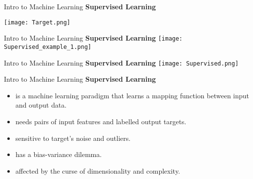 \documentclass{beamer}
\begin{document}
\begin{frame}[fragile]{Intro to Machine Learning}
    \textbf{Supervised Learning}
    \begin{center}
        \texttt{[image: Target.png]}
    \end{center}
\end{frame}
\begin{frame}[fragile]{Intro to Machine Learning}
    \textbf{Supervised Learning}
    \texttt{[image: Supervised\_example\_1.png]}
\end{frame}
\begin{frame}[fragile]{Intro to Machine Learning}
    \textbf{Supervised Learning}
    \texttt{[image: Supervised.png]}
\end{frame}
\begin{frame}[fragile]{Intro to Machine Learning}
    \textbf{Supervised Learning}
    \begin{itemize}
        \item is a machine learning paradigm that learns a mapping function between input and output data.
        \item needs pairs of input features and labelled output targets.
        \pause
        \item sensitive to target's noise and outliers.
        \item has a bias-variance dilemma.
        \item affected by the curse of dimensionality and complexity.
    \end{itemize}
\end{frame}
\end{document}
